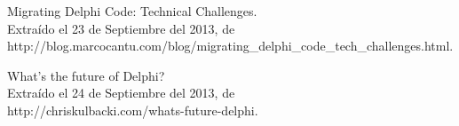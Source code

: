 \documentclass[letterpaper,11pt]{article}
\begin{document}
\begin{thebibliography}{99}

 Migrating Delphi Code: Technical Challenges.\\
Extraído el 23 de Septiembre del 2013, de\\
http://blog.marcocantu.com/blog/migrating\_delphi\_code\_tech\_challenges.html.

 What's the future of Delphi?\\
Extraído el 24 de Septiembre del 2013, de\\
http://chriskulbacki.com/whats-future-delphi.

\end{thebibliography}
\end{document}
